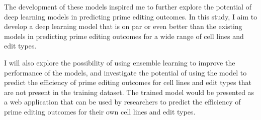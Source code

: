 The development of these models inspired me to further explore the potential of deep learning models in predicting prime editing outcomes. In this study, I aim to develop a deep learning model that is on par or even better than the existing models in predicting prime editing outcomes for a wide range of cell lines and edit types. 

I will also explore the possibility of using ensemble learning to improve the performance of the models, and investigate the potential of using the model to predict the efficiency of prime editing outcomes for cell lines and edit types that are not present in the training dataset. The trained model would be presented as a web application that can be used by researchers to predict the efficiency of prime editing outcomes for their own cell lines and edit types.